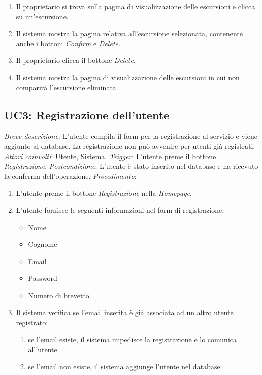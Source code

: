 \begin{enumerate}
    \item Il proprietario si trova sulla pagina di visualizzazione delle escursioni e clicca su un'escursione.
    \item Il sistema mostra la pagina relativa all'escursione selezionata, contenente anche i bottoni \textit{Confirm} e \textit{Delete}.
    \item Il proprietario clicca il bottone \textit{Delete}.
    \item Il sistema mostra la pagina di visualizzazione delle escursioni in cui non comparirà l'escursione eliminata.
\end{enumerate}

\clearpage

\subsection{UC3: Registrazione dell'utente}
 \emph{Breve descrizione}: L'utente compila il form per la registrazione al servizio e viene aggiunto al database. La registrazione non può avvenire per utenti già registrati.\medbreak
 \emph{Attori coinvolti}: Utente, Sistema.\medbreak
 \emph{Trigger}: L'utente preme il bottone \textit{Registrazione}.\medbreak
 \emph{Postcondizione}: L'utente è stato inserito nel database e ha ricevuto la conferma dell'operazione.\medbreak
 \emph{Procedimento}:
\begin{enumerate}
    \item L'utente preme il bottone \textit{Registrazione} nella \textit{Homepage}.
    \item L'utente fornisce le seguenti informazioni nel form di registrazione:
    \begin{itemize}
        \item Nome
        \item Cognome
        \item Email
        \item Password
        \item Numero di brevetto
    \end{itemize}
    \item Il sistema verifica se l'email inserita è già associata ad un altro utente registrato:
          \begin{enumerate}
              \item se l'email esiste, il sistema impedisce la registrazione e lo comunica all'utente
              \item se l'email non esiste, il sistema aggiunge l'utente nel database.
          \end{enumerate}
\end{enumerate}

